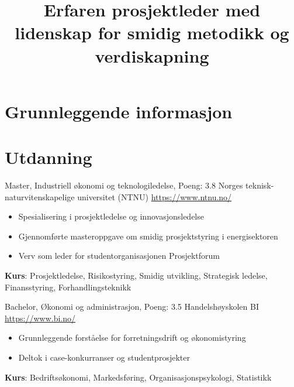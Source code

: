 \documentclass[a4paper, serif, 10pt]{moderncv}
\title{Erfaren prosjektleder med lidenskap for smidig metodikk og verdiskapning}
\begin{document}
\maketitle

\section{Grunnleggende informasjon}

\section{Utdanning}

        {Master, Industriell økonomi og teknologiledelse, Poeng: 3.8}
        {Norges teknisk-naturvitenskapelige universitet (NTNU)}
        {\url{https://www.ntnu.no/}}
        {}
        {\begin{itemize}
\item Spesialisering i prosjektledelse og innovasjonsledelse
\item Gjennomførte masteroppgave om smidig prosjektstyring i energisektoren
\item Verv som leder for studentorganisasjonen Prosjektforum
\end{itemize}
\textbf{Kurs}: Prosjektledelse, Risikostyring, Smidig utvikling, Strategisk ledelse, Finansstyring, Forhandlingsteknikk}

        {Bachelor, Økonomi og administrasjon, Poeng: 3.5}
        {Handelshøyskolen BI}
        {\url{https://www.bi.no/}}
        {}
        {\begin{itemize}
\item Grunnleggende forståelse for forretningsdrift og økonomistyring
\item Deltok i case-konkurranser og studentprosjekter
\end{itemize}
\textbf{Kurs}: Bedriftsøkonomi, Markedsføring, Organisasjonspsykologi, Statistikk}
\end{document}
